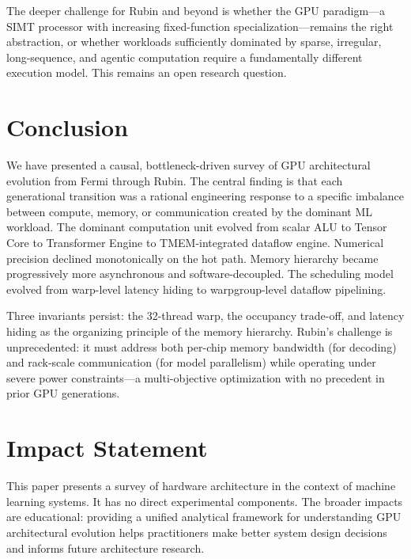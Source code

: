 \documentclass[10pt,twocolumn]{article}
\begin{document}
The deeper challenge for Rubin and beyond is whether the GPU paradigm—a SIMT processor with increasing fixed-function specialization—remains the right abstraction, or whether workloads sufficiently dominated by sparse, irregular, long-sequence, and agentic computation require a fundamentally different execution model. This remains an open research question.

\section{Conclusion}

We have presented a causal, bottleneck-driven survey of GPU architectural evolution from Fermi through Rubin. The central finding is that each generational transition was a rational engineering response to a specific imbalance between compute, memory, or communication created by the dominant ML workload. The dominant computation unit evolved from scalar ALU to Tensor Core to Transformer Engine to TMEM-integrated dataflow engine. Numerical precision declined monotonically on the hot path. Memory hierarchy became progressively more asynchronous and software-decoupled. The scheduling model evolved from warp-level latency hiding to warpgroup-level dataflow pipelining.

Three invariants persist: the 32-thread warp, the occupancy trade-off, and latency hiding as the organizing principle of the memory hierarchy. Rubin's challenge is unprecedented: it must address both per-chip memory bandwidth (for decoding) and rack-scale communication (for model parallelism) while operating under severe power constraints—a multi-objective optimization with no precedent in prior GPU generations.

\section*{Impact Statement}
This paper presents a survey of hardware architecture in the context of machine learning systems. It has no direct experimental components. The broader impacts are educational: providing a unified analytical framework for understanding GPU architectural evolution helps practitioners make better system design decisions and informs future architecture research.



\end{document}
